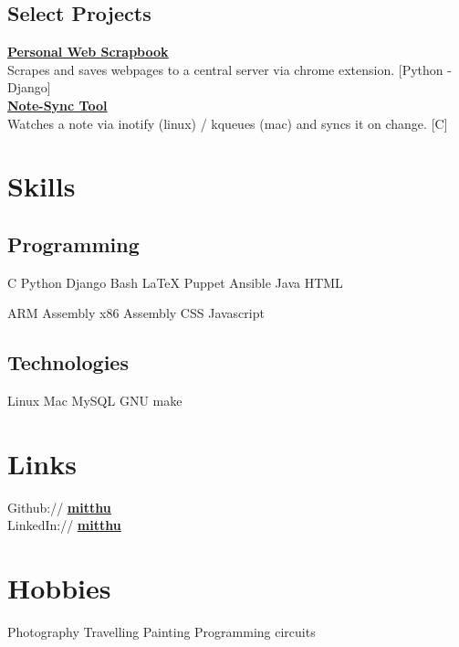 \documentclass[]{deedy}
\newcommand{\linkstyle}[1]{\textbf{\ul{#1}}}
\let\oldhref\href
\renewcommand{\href}[2]{%
\oldhref{#1}{\linkstyle{#2}}%
}
\begin{document}
\begin{minipage}[t]{0.33\textwidth}
\subsection{Select Projects}
\href{https://bitbucket.org/mitthu/capsule/src/}{Personal Web Scrapbook}\\
Scrapes and saves webpages to a central server via chrome extension. [Python - Django]\\[1.5ex]

\href{https://github.com/mitthu/note-sync}{Note-Sync Tool}\\
Watches a note via inotify (linux) / kqueues (mac) and syncs it on change. [C]

\section{Skills}
\subsection{Programming}
C \textbullet{} Python \textbullet{} Django \textbullet{} Bash \textbullet{} \LaTeX \textbullet{} Puppet \textbullet{} Ansible \textbullet{} Java \textbullet{} HTML
\sectionsep

ARM Assembly \textbullet{} x86 Assembly \textbullet{} CSS \textbullet{} Javascript
\sectionsep

\subsection{Technologies}
Linux \textbullet{} Mac \textbullet{} MySQL \textbullet{} GNU make

\section{Links} 
Github:// \href{https://github.com/mitthu}{mitthu} \\
LinkedIn://  \href{https://www.linkedin.com/in/mitthu}{mitthu}

\section{Hobbies}
Photography \textbullet{} Travelling \textbullet{} Painting \textbullet{} Programming circuits

\end{minipage} \hfill
\end{document}
